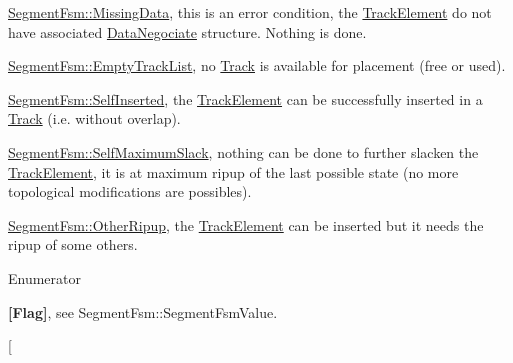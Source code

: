 \begin{DoxyItemize}
\item \hyperlink{classKite_1_1SegmentFsm_a5d74787dedbc4e11c1ab15bf487e61f8a79ae4f26b8ed9c55b81f981bb5076e1d}{Segment\-Fsm\-::\-Missing\-Data}, this is an error condition, the \hyperlink{classKite_1_1TrackElement}{Track\-Element} do not have associated \hyperlink{classKite_1_1DataNegociate}{Data\-Negociate} structure. Nothing is done.
\item \hyperlink{classKite_1_1SegmentFsm_a5d74787dedbc4e11c1ab15bf487e61f8a13ac7e0722ca806ff25d8fa9220e980b}{Segment\-Fsm\-::\-Empty\-Track\-List}, no \hyperlink{classKite_1_1Track}{Track} is available for placement (free or used).
\item \hyperlink{classKite_1_1SegmentFsm_a5d74787dedbc4e11c1ab15bf487e61f8a8c564779c81599aaadbe879fa2b08d92}{Segment\-Fsm\-::\-Self\-Inserted}, the \hyperlink{classKite_1_1TrackElement}{Track\-Element} can be successfully inserted in a \hyperlink{classKite_1_1Track}{Track} (i.\-e. without overlap).
\item \hyperlink{classKite_1_1SegmentFsm_a5d74787dedbc4e11c1ab15bf487e61f8a560766bb79539564fdeda432c8efae6d}{Segment\-Fsm\-::\-Self\-Maximum\-Slack}, nothing can be done to further slacken the \hyperlink{classKite_1_1TrackElement}{Track\-Element}, it is at maximum ripup of the last possible state (no more topological modifications are possibles).
\item \hyperlink{classKite_1_1SegmentFsm_a5d74787dedbc4e11c1ab15bf487e61f8a22374bab829fac7d12af4784d80eeb6e}{Segment\-Fsm\-::\-Other\-Ripup}, the \hyperlink{classKite_1_1TrackElement}{Track\-Element} can be inserted but it needs the ripup of some others. 
\end{DoxyItemize}\begin{Desc}
\item[Enumerator]\par
\begin{description}
\item[{\em 
\hypertarget{classKite_1_1SegmentFsm_a5d74787dedbc4e11c1ab15bf487e61f8a79ae4f26b8ed9c55b81f981bb5076e1d}{Missing\-Data}\label{classKite_1_1SegmentFsm_a5d74787dedbc4e11c1ab15bf487e61f8a79ae4f26b8ed9c55b81f981bb5076e1d}
}]{\bfseries \mbox{[}Flag\mbox{]}}, see Segment\-Fsm\-::\-Segment\-Fsm\-Value. \item[{\em 
}
\end{description}
\end{Desc}
